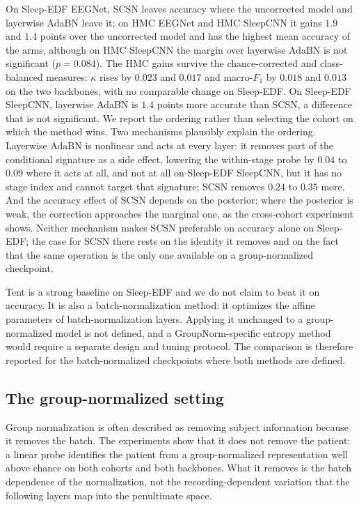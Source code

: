On Sleep-EDF EEGNet, SCSN leaves accuracy where the uncorrected model and
layerwise AdaBN leave it; on HMC EEGNet and HMC SleepCNN it gains $1.9$ and
$1.4$ points over the uncorrected model and has the highest mean accuracy of
the arms, although on HMC SleepCNN the margin over layerwise AdaBN is not
significant ($p=0.084$).
The HMC gains survive the chance-corrected and class-balanced measures:
$\kappa$ rises by $0.023$ and $0.017$ and macro-$F_1$ by $0.018$ and $0.013$
on the two backbones, with no comparable change on Sleep-EDF.
On Sleep-EDF SleepCNN, layerwise AdaBN is $1.4$ points more accurate than
SCSN, a difference that is not significant. We report the ordering rather
than selecting the cohort on which the method wins. Two mechanisms plausibly
explain the ordering. Layerwise AdaBN is nonlinear and acts at every layer:
it removes part of the conditional signature as a side effect, lowering the
within-stage probe by $0.04$ to $0.09$ where it acts at all, and not at all
on Sleep-EDF SleepCNN, but it has no stage index and cannot target that
signature; SCSN removes $0.24$ to $0.35$ more. And the accuracy effect of
SCSN depends on the posterior: where the posterior is weak, the correction
approaches the marginal one, as the cross-cohort experiment shows. Neither
mechanism makes SCSN preferable on accuracy alone on Sleep-EDF; the case for
SCSN there rests on the identity it removes and on the fact that the same
operation is the only one available on a group-normalized checkpoint.

Tent is a strong baseline on Sleep-EDF and we do not claim to beat it on
accuracy. It is also a batch-normalization method: it optimizes the affine
parameters of batch-normalization layers. Applying it unchanged to a
group-normalized model is not defined, and a GroupNorm-specific entropy method
would require a separate design and tuning protocol. The comparison is
therefore reported for the batch-normalized checkpoints where both methods are
defined.

\subsection{The group-normalized setting}

Group normalization is often described as removing subject information
because it removes the batch. The experiments show that it does not remove
the patient: a linear probe identifies the patient from a group-normalized
representation well above chance on both cohorts and both backbones. What it
removes is the batch dependence of the normalization, not the
recording-dependent variation that the following layers map into the
penultimate space.

